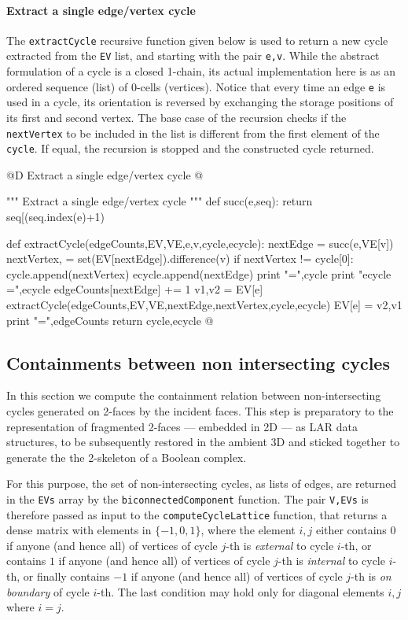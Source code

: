 \documentclass[11pt,oneside]{article}	%
\begin{document}
\paragraph{Extract a single edge/vertex cycle}
The \texttt{extractCycle} recursive function given below is used to return a new cycle extracted from the \texttt{EV} list, and starting with the pair \texttt{e,v}. While the abstract formulation of a cycle is a closed 1-chain, its actual implementation here is as an ordered sequence (list) of 0-cells (vertices). Notice that every time an edge \texttt{e} is used in a cycle, its orientation is reversed by exchanging the storage positions of its first and second vertex.  The base case of the recursion checks if the \texttt{nextVertex} to be included in the list is different from the first element of the \texttt{cycle}. If equal, the recursion is stopped and the constructed cycle returned.
 
@D Extract a single edge/vertex cycle
@{""" Extract a single edge/vertex cycle """ 
def succ(e,seq):
    return seq[(seq.index(e)+1) %
   
def extractCycle(edgeCounts,EV,VE,e,v,cycle,ecycle):        
    nextEdge = succ(e,VE[v])
    nextVertex, = set(EV[nextEdge]).difference({v})
    if nextVertex != cycle[0]:
        cycle.append(nextVertex)
        ecycle.append(nextEdge)
        print "\ncycle =",cycle
        print "ecycle =",ecycle
        edgeCounts[nextEdge] += 1 
        v1,v2 = EV[e]
        extractCycle(edgeCounts,EV,VE,nextEdge,nextVertex,cycle,ecycle)
        EV[e] = v2,v1
    print "\nedgeCounts =",edgeCounts
    return cycle,ecycle
@}
    


\subsection{Containments between non intersecting cycles}

In this section we compute the containment relation between non-intersecting cycles generated on 2-faces by the incident faces. This step is preparatory to the representation of fragmented 2-faces --- embedded in 2D --- as LAR data structures, to be subsequently restored in the ambient 3D and sticked together to generate the the 2-skeleton of a Boolean complex.

For this purpose, the set of non-intersecting cycles, as lists of edges, are returned in the \texttt{EVs} array by the \texttt{biconnectedComponent} function. The pair \texttt{V,EVs} is therefore passed as input to the \texttt{computeCycleLattice} function, that returns a dense matrix with elements in $\{-1,0,1\}$, where the element $i,j$ either contains $0$ if anyone (and hence all) of vertices of cycle $j$-th is \emph{external} to cycle $i$-th, or contains $1$ if anyone (and hence all) of vertices of cycle $j$-th is \emph{internal} to cycle $i$-th, or finally contains $-1$ if anyone (and hence all) of vertices of cycle $j$-th is \emph{on boundary} of cycle $i$-th. The last condition may hold only for diagonal elements $i,j$ where $i=j$.
\end{document}
